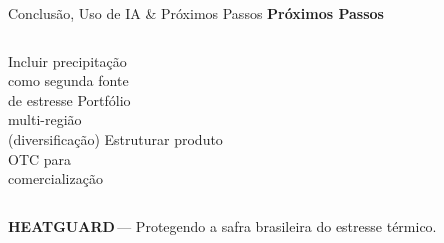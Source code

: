 \documentclass[aspectratio=169]{beamer}
\newcommand{\heatguard}{\textbf{\textcolor{HGLaranja}{HEAT}\textcolor{HGAzul}{GUARD}}}
\begin{document}
\begin{frame}{Conclusão, Uso de IA \& Próximos Passos}
  \vspace{0.25cm}
  \textbf{Próximos Passos}
  \begin{columns}
      \small Incluir precipitação \\ como segunda fonte \\ de estresse
      \small Portfólio \\ multi-região \\ (diversificação)
      \small Estruturar produto \\ OTC para \\ comercialização
  \end{columns}

  \vspace{0.15cm}
  \begin{center}
    \small
    \heatguard \,— Protegendo a safra brasileira do estresse térmico.
  \end{center}

\end{frame}
\end{document}
